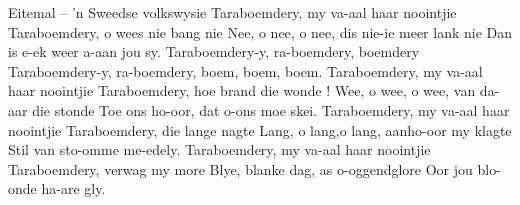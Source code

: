 \beginverse*
Eitemal – 'n Sweedse volkswysie
\endverse
\beginverse*
Taraboemdery, my va-aal haar noointjie
Taraboemdery, o wees nie bang nie
Nee, o nee, o nee, dis nie-ie meer lank nie
Dan is e-ek weer a-aan jou sy.
\endverse
\beginchorus
Taraboemdery-y, ra-boemdery, boemdery
Taraboemdery-y, ra-boemdery, boem, boem, boem.
\endchorus
\beginverse*
Taraboemdery, my va-aal haar noointjie
Taraboemdery, hoe brand die wonde !
Wee, o wee, o wee, van da-aar die stonde
Toe ons ho-oor, dat o-ons moe skei.
\endverse
\beginverse*
Taraboemdery, my va-aal haar noointjie
Taraboemdery, die lange nagte
Lang, o lang,o lang, aanho-oor my klagte
Stil van sto-omme me-edely.
\endverse
\beginverse*
Taraboemdery, my va-aal haar noointjie
Taraboemdery, verwag my more
Blye, blanke dag, as o-oggendglore
Oor jou blo-onde ha-are gly.
\endverse
\endsong 